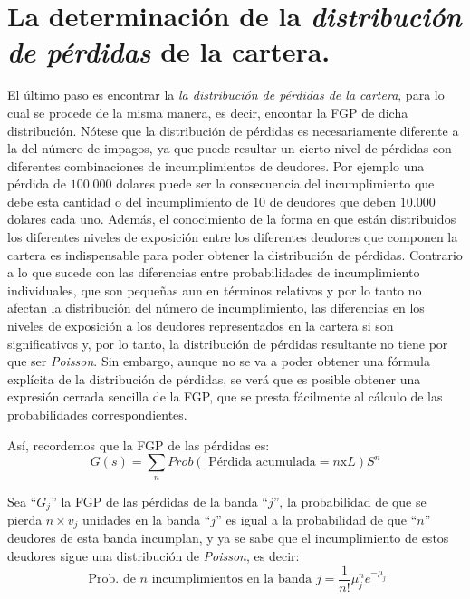 \documentclass[
  12pt,
]{krantz}
\theoremstyle{definition}
\theoremstyle{definition}
\theoremstyle{definition}
\theoremstyle{remark}
\begin{document}
\hypertarget{la-determinacion-de-la-distribucion-de-perdidas-de-la-cartera.}{%
\section{\texorpdfstring{La determinación de la \emph{distribución de pérdidas} de la cartera.}{La determinación de la distribución de pérdidas de la cartera.}}\label{la-determinacion-de-la-distribucion-de-perdidas-de-la-cartera.}}

El último paso es encontrar la \emph{la distribución de pérdidas de la cartera}, para lo cual se procede de la misma manera, es decir, encontar la FGP de dicha distribución. Nótese que la distribución de pérdidas es necesariamente diferente a la del número de impagos, ya que puede resultar un cierto nivel de pérdidas con diferentes combinaciones de incumplimientos de deudores. Por ejemplo una pérdida de \(100.000\) dolares puede ser la consecuencia del incumplimiento que debe esta cantidad o del incumplimiento de \(10\) de deudores que deben \(10.000\) dolares cada uno. Además, el conocimiento de la forma en que están distribuidos los diferentes niveles de exposición entre los diferentes deudores que componen la cartera es indispensable para poder obtener la distribución de pérdidas. Contrario a lo que sucede con las diferencias entre probabilidades de incumplimiento individuales, que son pequeñas aun en términos relativos y por lo tanto no afectan la distribución del número de incumplimiento, las diferencias en los niveles de exposición a los deudores representados en la cartera si son significativos y, por lo tanto, la distribución de pérdidas resultante no tiene por que ser \emph{Poisson}. Sin embargo, aunque no se va a poder obtener una fórmula explícita de la distribución de pérdidas, se verá que es posible obtener una expresión cerrada sencilla de la FGP, que se presta fácilmente al cálculo de las probabilidades correspondientes.

Así, recordemos que la FGP de las pérdidas es: \[G(s)=\sum_nProb(\textrm{ Pérdida acumulada}=n\textrm{x}L)S^n\]

Sea ``\(G_j\)'' la FGP de las pérdidas de la banda ``\(j\)'', la probabilidad de que se pierda \(n\times v_j\) unidades en la banda ``\(j\)'' es igual a la probabilidad de que ``\(n\)'' deudores de esta banda incumplan, y ya se sabe que el incumplimiento de estos deudores sigue una distribución de \emph{Poisson}, es decir:\[\textrm{ Prob. de }n\textrm{ incumplimientos en la banda }j=\frac{1}{n!}\mu_j^ne^{-\mu_j}\]
\end{document}
